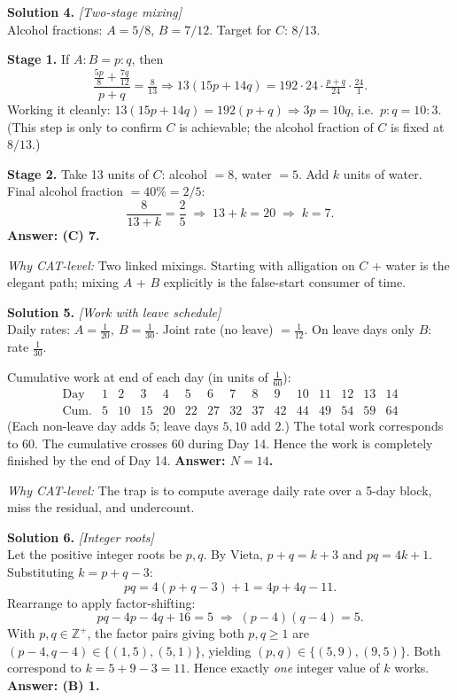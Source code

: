 \documentclass[11pt,a4paper]{article}
\begin{document}
\vspace{4pt}
\textbf{Solution 4.} \textit{[Two-stage mixing]}\\
Alcohol fractions: $A = 5/8$, $B = 7/12$. Target for $C$: $8/13$.

\textbf{Stage 1.} If $A : B = p : q$, then
\[
\frac{\tfrac{5p}{8} + \tfrac{7q}{12}}{p+q} = \tfrac{8}{13}
\Longrightarrow 13(15p + 14q) = 192 \cdot 24 \cdot \tfrac{p+q}{24} \cdot \tfrac{24}{1}.
\]
Working it cleanly: $13(15p + 14q) = 192(p+q) \Rightarrow 3p = 10q$, i.e.\ $p:q = 10:3$. (This step is only to confirm $C$ is achievable; the alcohol fraction of $C$ is fixed at $8/13$.)

\textbf{Stage 2.} Take 13 units of $C$: alcohol $= 8$, water $= 5$. Add $k$ units of water. Final alcohol fraction $= 40\% = 2/5$:
\[
\frac{8}{13 + k} = \frac{2}{5} \;\Longrightarrow\; 13 + k = 20 \;\Longrightarrow\; k = 7.
\]
\textbf{Answer: (C) 7.}

\textit{Why CAT-level:} Two linked mixings. Starting with alligation on $C$ + water is the elegant path; mixing $A$ + $B$ explicitly is the false-start consumer of time.

\vspace{4pt}
\textbf{Solution 5.} \textit{[Work with leave schedule]}\\
Daily rates: $A = \tfrac{1}{20},\ B = \tfrac{1}{30}$. Joint rate (no leave) $= \tfrac{1}{12}$. On leave days only $B$: rate $\tfrac{1}{30}$.

Cumulative work at end of each day (in units of $\tfrac{1}{60}$):
\[
\begin{array}{c|cccccccccccccc}
\text{Day} & 1 & 2 & 3 & 4 & 5 & 6 & 7 & 8 & 9 & 10 & 11 & 12 & 13 & 14\\
\hline
\text{Cum.} & 5 & 10 & 15 & 20 & 22 & 27 & 32 & 37 & 42 & 44 & 49 & 54 & 59 & 64
\end{array}
\]
(Each non-leave day adds $5$; leave days $5, 10$ add $2$.) The total work corresponds to $60$. The cumulative crosses $60$ during Day 14. Hence the work is completely finished by the end of Day 14.
\textbf{Answer: $N = 14$.}

\textit{Why CAT-level:} The trap is to compute average daily rate over a 5-day block, miss the residual, and undercount.

\vspace{4pt}
\textbf{Solution 6.} \textit{[Integer roots]}\\
Let the positive integer roots be $p, q$.
By Vieta, $p+q = k+3$ and $pq = 4k+1$. Substituting $k = p+q-3$:
\[
pq = 4(p+q-3) + 1 = 4p + 4q - 11.
\]
Rearrange to apply factor-shifting:
\[
pq - 4p - 4q + 16 = 5 \;\Longrightarrow\; (p-4)(q-4) = 5.
\]
With $p, q \in \mathbb{Z}^{+}$, the factor pairs giving both $p, q \ge 1$ are $(p-4, q-4) \in \{(1,5),(5,1)\}$, yielding $(p,q) \in \{(5,9),(9,5)\}$. Both correspond to $k = 5+9-3 = 11$.
Hence exactly \emph{one} integer value of $k$ works.
\textbf{Answer: (B) 1.}
\end{document}
